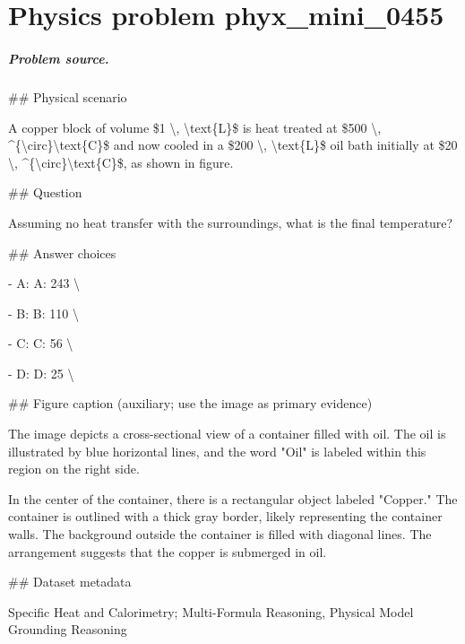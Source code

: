 
\chapter{Physics problem phyx\_mini\_0455}
\label{ch:PhyXMiniProblems_problem_phyx_mini_0455}

\paragraph{Problem source.}
\#\# Physical scenario

A copper block of volume \$1 \textbackslash{}, \textbackslash{}text\{L\}\$ is heat treated at \$500 \textbackslash{}, \textasciicircum{}\{\textbackslash{}circ\}\textbackslash{}text\{C\}\$ and now cooled in a \$200 \textbackslash{}, \textbackslash{}text\{L\}\$ oil bath initially at \$20 \textbackslash{}, \textasciicircum{}\{\textbackslash{}circ\}\textbackslash{}text\{C\}\$, as shown in figure.

\#\# Question

Assuming no heat transfer with the surroundings, what is the final temperature?

\#\# Answer choices

- A: A: 243 \textbackslash{}

- B: B: 110 \textbackslash{}

- C: C: 56 \textbackslash{}

- D: D: 25 \textbackslash{}

\#\# Figure caption (auxiliary; use the image as primary evidence)

The image depicts a cross-sectional view of a container filled with oil. The oil is illustrated by blue horizontal lines, and the word "Oil" is labeled within this region on the right side. 

In the center of the container, there is a rectangular object labeled "Copper." The container is outlined with a thick gray border, likely representing the container walls. The background outside the container is filled with diagonal lines. The arrangement suggests that the copper is submerged in oil.

\#\# Dataset metadata

Specific Heat and Calorimetry; Multi-Formula Reasoning, Physical Model Grounding Reasoning

